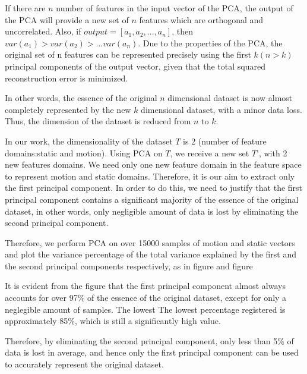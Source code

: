 If there are $n$ number of features in the input vector of the PCA, the output of the
PCA will provide a new set of $n$ features which are orthogonal and uncorrelated. Also, if
$output=[a_{1}, a_{2}, ..., a_{n}]$, then $var(a_{1})>var(a_{2})>...var(a_{n})$. 
Due to the properties of the PCA, the original set of n features can be 
represented precisely using the first $k(n>k)$ principal
components of the output vector, given that the total squared reconstruction error 
is minimized.

In other words, the essence of the original $n$ dimensional dataset is now almost
completely represented by the new $k$ dimensional dataset, with a minor data loss. Thus, the
dimension of the dataset is reduced from $n$ to $k$.


In our work, the dimensionality of the dataset $T$ is 2 (number of feature domains:static 
and motion).
Using PCA on $T$, we receive a new set $T’$, with 2 new features domains. We need only one new feature 
domain in the feature space to
represent motion and static domains. Therefore, it is our aim to extract only the first principal component. 
In order to do this, we need to justify that the first principal component contains a significant majority of
the essence of the original dataset, in other words, only negligible amount of data is lost by
eliminating the second principal component.

Therefore, we perform PCA on over 15000 samples of motion and static
vectors and plot the variance percentage of the total variance
explained by the first and the second principal components respectively, as in figure and figure


It is evident from the figure that the first principal component almost always accounts 
for over 97\% of the essence of the original dataset, except for only a neglegible amount
of samples. The lowest The lowest percentage registered is approximately 85\%, which is still a
significantly high value.

Therefore, by eliminating the second principal component, only less than 5\% of data
is lost in average, and hence only the first principal component can be used to accurately
represent the original dataset.